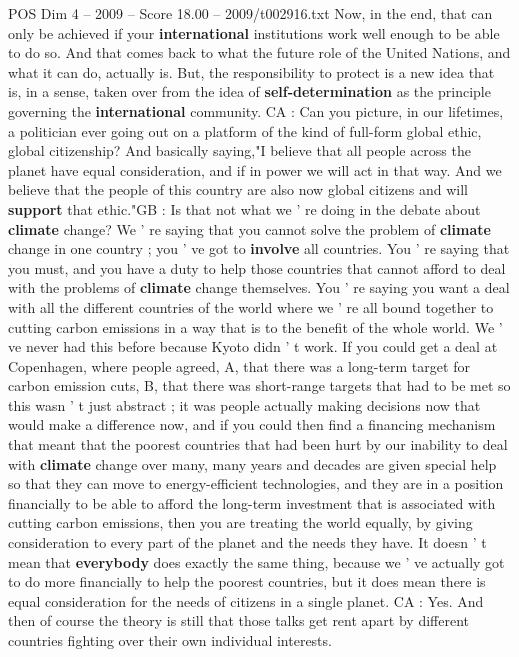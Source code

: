 \begin{textsample}{POS Dim 4 – 2009 – Score 18.00 – 2009/t002916.txt}
Now, in the end, that can only be achieved if your \textbf{international} institutions work well enough to be able to do so.
And that comes back to what the future role of the United Nations, and what it can do, actually is.
But, the responsibility to protect is a new idea that is, in a sense, taken over from the idea of \textbf{self-determination} as the principle governing the \textbf{international} community.
CA : Can you picture, in our lifetimes, a politician ever going out on a platform of the kind of full-form global ethic, global citizenship?
And basically saying,"I believe that all people across the planet have equal consideration, and if in power we will act in that way.
And we believe that the people of this country are also now global citizens and will \textbf{support} that ethic."GB : Is that not what we ' re doing in the debate about \textbf{climate} change?
We ' re saying that you cannot solve the problem of \textbf{climate} change in one country ; you ' ve got to \textbf{involve} all countries.
You ' re saying that you must, and you have a duty to help those countries that cannot afford to deal with the problems of \textbf{climate} change themselves.
You ' re saying you want a deal with all the different countries of the world where we ' re all bound together to cutting carbon emissions in a way that is to the benefit of the whole world.
We ' ve never had this before because Kyoto didn ' t work.
If you could get a deal at Copenhagen, where people agreed, A, that there was a long-term target for carbon emission cuts, B, that there was short-range targets that had to be met so this wasn ' t just abstract ; it was people actually making decisions now that would make a difference now, and if you could then find a financing mechanism that meant that the poorest countries that had been hurt by our inability to deal with \textbf{climate} change over many, many years and decades are given special help so that they can move to energy-efficient technologies, and they are in a position financially to be able to afford the long-term investment that is associated with cutting carbon emissions, then you are treating the world equally, by giving consideration to every part of the planet and the needs they have.
It doesn ' t mean that \textbf{everybody} does exactly the same thing, because we ' ve actually got to do more financially to help the poorest countries, but it does mean there is equal consideration for the needs of citizens in a single planet.
CA : Yes.
And then of course the theory is still that those talks get rent apart by different countries fighting over their own individual interests.

\end{textsample}
